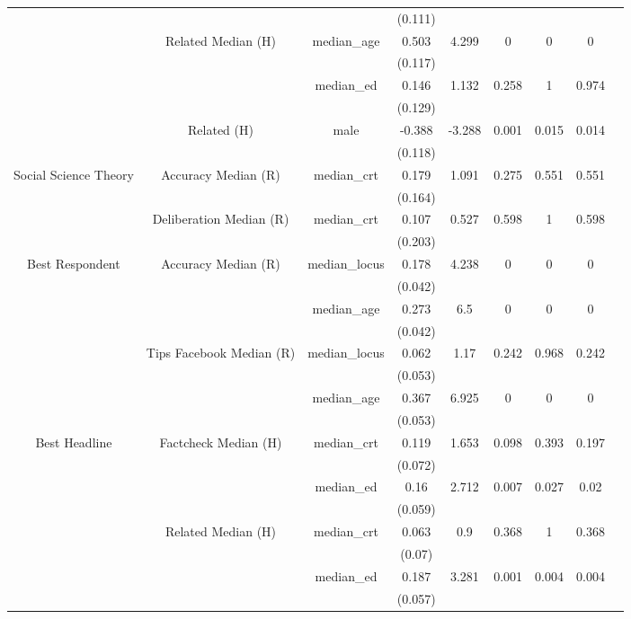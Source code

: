 \begin{tabular}{ccccccccc}
   &  &  & (0.111) &  &  &  &  &  \\ 
   & Related Median (H) & median\_age & 0.503 & 4.299 & 0 & 0 & 0 &  \\ 
   &  &  & (0.117) &  &  &  &  &  \\ 
   &  & median\_ed & 0.146 & 1.132 & 0.258 & 1 & 0.974 &  \\ 
   &  &  & (0.129) &  &  &  &  &  \\ 
   & Related (H) & male & -0.388 & -3.288 & 0.001 & 0.015 & 0.014 &  \\ 
   &  &  & (0.118) &  &  &  &  &  \\ 
  Social Science Theory & Accuracy Median (R) & median\_crt & 0.179 & 1.091 & 0.275 & 0.551 & 0.551 &  \\ 
   &  &  & (0.164) &  &  &  &  &  \\ 
   & Deliberation Median (R) & median\_crt & 0.107 & 0.527 & 0.598 & 1 & 0.598 &  \\ 
   &  &  & (0.203) &  &  &  &  &  \\ 
  Best Respondent & Accuracy Median (R) & median\_locus & 0.178 & 4.238 & 0 & 0 & 0 &  \\ 
   &  &  & (0.042) &  &  &  &  &  \\ 
   &  & median\_age & 0.273 & 6.5 & 0 & 0 & 0 &  \\ 
   &  &  & (0.042) &  &  &  &  &  \\ 
   & Tips Facebook Median (R) & median\_locus & 0.062 & 1.17 & 0.242 & 0.968 & 0.242 &  \\ 
   &  &  & (0.053) &  &  &  &  &  \\ 
   &  & median\_age & 0.367 & 6.925 & 0 & 0 & 0 &  \\ 
   &  &  & (0.053) &  &  &  &  &  \\ 
  Best Headline & Factcheck Median (H) & median\_crt & 0.119 & 1.653 & 0.098 & 0.393 & 0.197 &  \\ 
   &  &  & (0.072) &  &  &  &  &  \\ 
   &  & median\_ed & 0.16 & 2.712 & 0.007 & 0.027 & 0.02 &  \\ 
   &  &  & (0.059) &  &  &  &  &  \\ 
   & Related Median (H) & median\_crt & 0.063 & 0.9 & 0.368 & 1 & 0.368 &  \\ 
   &  &  & (0.07) &  &  &  &  &  \\ 
   &  & median\_ed & 0.187 & 3.281 & 0.001 & 0.004 & 0.004 &  \\ 
   &  &  & (0.057) &  &  &  &  &  \\ 

\end{tabular}
